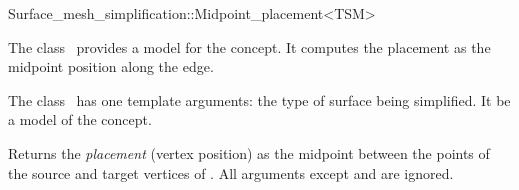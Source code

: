 

\begin{ccRefClass}{Surface_mesh_simplification::Midpoint_placement<TSM>}


\ccDefinition

The class \ccRefName\ provides a model for the  concept. 
It computes the placement as the midpoint position along the edge.

The class \ccRefName\ has one template arguments: the type of surface being simplified. 
It be a model of the  concept.


\ccIsModel
{}

\ccCreation
{}  %

  {Returns the {\em placement} (vertex position) as the midpoint between 
  the points of the source and target vertices of  . All arguments
  except  and  are ignored.
  }

\end{ccRefClass}


